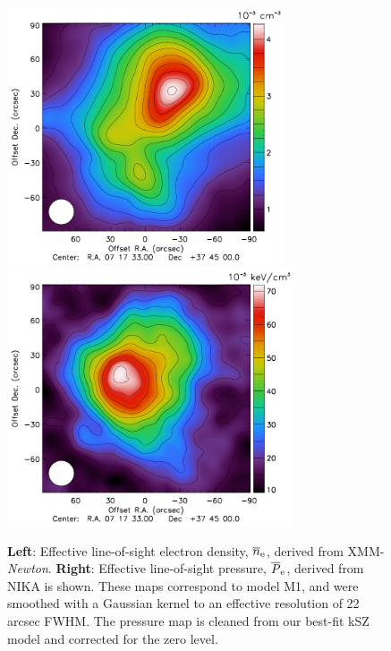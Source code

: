 \documentclass[twocolumn,traditabstract]{aa}
\begin{document}
\begin{figure}[h]
\centering
\includegraphics[height=7.6cm]{Figure/Thermo_N1.pdf}
\includegraphics[height=7.6cm]{Figure/Thermo_Pclean1.pdf}
\caption{\footnotesize{{\bf Left}: Effective line-of-sight electron density, $\overline{n}_{\rm e}$, derived from XMM-\textit{Newton}. {\bf Right}: Effective line-of-sight pressure, $\overline{P}_{\rm e}$, derived from NIKA is shown. These maps correspond to model M1, and were smoothed with a Gaussian kernel to an effective resolution of 22 arcsec FWHM. The pressure map is cleaned from our best-fit kSZ model and corrected for the zero level.}}\label{fig:Input_maps}
\end{figure}

\end{document}

